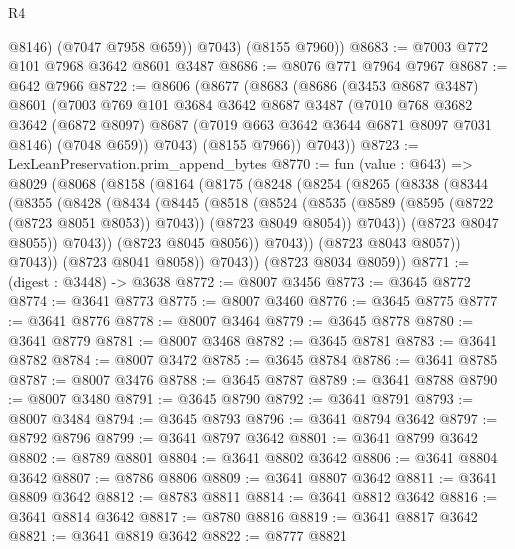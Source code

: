 \begin{lexlean}{R4}
\begin{coremodule}
            @8146)
          (@7047 @7958 @659))
        @7043)
      (@8155 @7960))
@8683 := @7003 @772 @101 @7968 @3642 @8601 @3487
@8686 := @8076 @771 @7964 @7967
@8687 := @642 @7966
@8722 := @8606
    (@8677
      (@8683
        (@8686
          (@3453 @8687 @3487)
          @8601
          (@7003
            @769
            @101
            @3684
            @3642
            @8687
            @3487
            (@7010
              @768
              @3682
              @3642
              (@6872 @8097)
              @8687
              (@7019 @663 @3642 @3644 @6871 @8097 @7031 @8146)
              (@7048 @659))
            @7043)
          (@8155 @7966))
        @7043))
@8723 := LexLeanPreservation.prim_append_bytes
@8770 := fun (value : @643) =>
  @8029
    (@8068
      (@8158
        (@8164
          (@8175
            (@8248
              (@8254
                (@8265
                  (@8338
                    (@8344
                      (@8355
                        (@8428
                          (@8434
                            (@8445
                              (@8518
                                (@8524
                                  (@8535
                                    (@8589 (@8595 (@8722 (@8723 @8051 @8053)) @7043))
                                    (@8723 @8049 @8054))
                                  @7043))
                              (@8723 @8047 @8055))
                            @7043))
                        (@8723 @8045 @8056))
                      @7043))
                  (@8723 @8043 @8057))
                @7043))
            (@8723 @8041 @8058))
          @7043))
      (@8723 @8034 @8059))
@8771 := (digest : @3448) -> @3638
@8772 := @8007 @3456
@8773 := @3645 @8772
@8774 := @3641 @8773
@8775 := @8007 @3460
@8776 := @3645 @8775
@8777 := @3641 @8776
@8778 := @8007 @3464
@8779 := @3645 @8778
@8780 := @3641 @8779
@8781 := @8007 @3468
@8782 := @3645 @8781
@8783 := @3641 @8782
@8784 := @8007 @3472
@8785 := @3645 @8784
@8786 := @3641 @8785
@8787 := @8007 @3476
@8788 := @3645 @8787
@8789 := @3641 @8788
@8790 := @8007 @3480
@8791 := @3645 @8790
@8792 := @3641 @8791
@8793 := @8007 @3484
@8794 := @3645 @8793
@8796 := @3641 @8794 @3642
@8797 := @8792 @8796
@8799 := @3641 @8797 @3642
@8801 := @3641 @8799 @3642
@8802 := @8789 @8801
@8804 := @3641 @8802 @3642
@8806 := @3641 @8804 @3642
@8807 := @8786 @8806
@8809 := @3641 @8807 @3642
@8811 := @3641 @8809 @3642
@8812 := @8783 @8811
@8814 := @3641 @8812 @3642
@8816 := @3641 @8814 @3642
@8817 := @8780 @8816
@8819 := @3641 @8817 @3642
@8821 := @3641 @8819 @3642
@8822 := @8777 @8821

\end{coremodule}
\end{lexlean}
